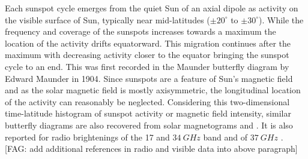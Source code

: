 \documentclass{aa}
\newcommand{\fag}[1]{\textcolor{midpurple}{[FAG: #1]}} %
\begin{document}
  Each sunspot cycle emerges from the quiet Sun of an axial dipole as
  activity on the visible surface of Sun, typically near mid-latitudes
  ($\pm20^{\circ}$ to $\pm 30^{\circ}$).
  While the frequency and coverage of the sunspots increases towards a maximum
  the location of the activity drifts equatorward. 
  This migration continues after the maximum with decreasing activity
  closer to the equator bringing the sunspot cycle to an end.
  This was first recorded in the Maunder butterfly diagram by Edward Maunder
  in 1904.
  Since sunspots are a feature of Sun's magnetic field and as the solar
  magnetic field is mostly axisymmetric, the longitudinal location of the
  activity can reasonably be neglected.
  Considering this two-dimensional time-latitude histogram of sunspot activity
  or magnetic field intensity, similar butterfly 
  diagrams are also recovered from solar magnetograms \citep{GHHZ83,VLMCS12}
  and \citep[][and references therein]{LUSDADM17}.
  It is also reported for radio brightenings of the 17 and $\SI{34}{GHz}$ band
  \citep{Shibasaki13,SCGVPS14} and of $\SI{37}{GHz}$ \citep{metsahovi40}.
  \fag{add additional references in radio and visible data into above paragraph}
 
 
\end{document}
